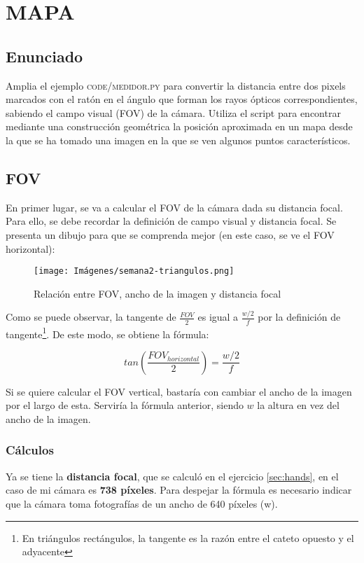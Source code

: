\documentclass[12pt]{article}
\begin{document}
\section{MAPA}
\subsection*{Enunciado}
Amplia el ejemplo \textsc{code/medidor.py} para convertir la distancia entre dos pixels marcados con el ratón en el ángulo que forman los rayos ópticos correspondientes, sabiendo el campo visual (FOV) de la cámara. Utiliza el script para encontrar mediante una construcción geométrica la posición aproximada en un mapa desde la que se ha tomado una imagen en la que se ven algunos puntos característicos.

\subsection*{FOV}
En primer lugar, se va a calcular el FOV de la cámara dada su distancia focal. Para ello, se debe recordar la definición de campo visual y distancia focal. Se presenta un dibujo para que se comprenda mejor (en este caso, se ve el FOV horizontal):

\begin{figure}[H]
    \centering
    \texttt{[image: Imágenes/semana2-triangulos.png]}
    \caption{Relación entre FOV, ancho de la imagen y distancia focal}
    \label{fig:semana2FOV}
\end{figure}

Como se puede observar, la tangente de $\frac{FOV}{2}$ es igual a $\frac{w/2}{f}$ por la definición de tangente\footnote{En triángulos rectángulos, la tangente es la razón entre el cateto opuesto y el adyacente}. De este modo, se obtiene la fórmula:

$$tan\left(\frac{FOV_{horizontal}}{2}\right) = \frac{w/2}{f}$$

Si se quiere calcular el FOV vertical, bastaría con cambiar el ancho de la imagen por el largo de esta. Serviría la fórmula anterior, siendo $w$ la altura en vez del ancho de la imagen.

\subsubsection*{Cálculos}

Ya se tiene la \textbf{distancia focal}, que se calculó en el ejercicio \ref{sec:hands}, en el caso de mi cámara es \textbf{738 píxeles}. Para despejar la fórmula es necesario indicar que la cámara toma fotografías de un ancho de 640 píxeles (w).
\end{document}
